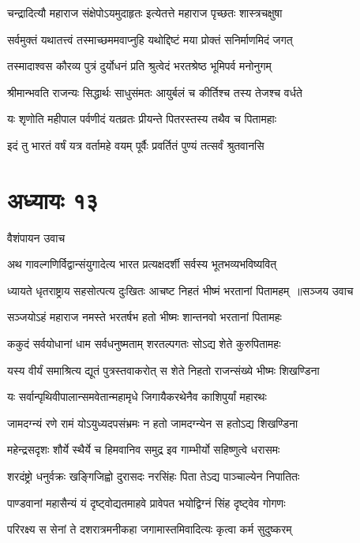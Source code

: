 \twolineshloka
{चन्द्रादित्यौ महाराज संक्षेपोऽयमुदाहृतः}
{इत्येतत्ते महाराज पृच्छतः शास्त्रचक्षुषा}


\twolineshloka
{सर्वमुक्तं यथातत्त्वं तस्माच्छममवाप्नुहि}
{यथोद्दिष्टं मया प्रोक्तं सनिर्माणमिदं जगत्}


\twolineshloka
{तस्मादाश्वस कौरव्य पुत्रं दुर्योधनं प्रति}
{श्रुत्वेदं भरतश्रेष्ठ भूमिपर्व मनोनुगम्}


\twolineshloka
{श्रीमान्भवति राजन्यः सिद्धार्थः साधुसंमतः}
{आयुर्बलं च कीर्तिश्च तस्य तेजश्च वर्धते}


\twolineshloka
{यः शृणोति महीपाल पर्वणीदं यतव्रतः}
{प्रीयन्ते पितरस्तस्य तथैव च पितामहाः}


\twolineshloka
{इदं तु भारतं वर्षं यत्र वर्तामहे वयम्}
{पूर्वैः प्रवर्तितं पुण्यं तत्सर्वं श्रुतवानसि}


\chapter{अध्यायः १३}
\twolineshloka
{वैशंपायन उवाच}
{}


\twolineshloka
{अथ गावल्गणिर्विद्वान्संयुगादेत्य भारत}
{प्रत्यक्षदर्शी सर्वस्य भूतभव्यभविष्यवित्}


\threelineshloka
{ध्यायते धृतराष्ट्राय सहसोत्पत्य दुःखितः}
{आचष्ट निहतं भीष्मं भरतानां पितामहम् ॥सञ्जय उवाच}
{}


\twolineshloka
{सञ्जयोऽहं महाराज नमस्ते भरतर्षभ}
{हतो भीष्मः शान्तनवो भरतानां पितामहः}


\twolineshloka
{ककुदं सर्वयोधानां धाम सर्वधनुष्मताम्}
{शरतल्पगतः सोऽद्य शेते कुरुपितामहः}


\twolineshloka
{यस्य वीर्यं समाश्रित्य द्यूतं पुत्रस्तवाकरोत्}
{स शेते निहतो राजन्संख्ये भीष्मः शिखण्डिना}


\twolineshloka
{यः सर्वान्पृथिवीपालान्समवेतान्महामृधे}
{जिगायैकरथेनैव काशिपुर्यां महारथः}


\twolineshloka
{जामदग्न्यं रणे रामं योऽयुध्यदपसंभ्रमः}
{न हतो जामदग्न्येन स हतोऽद्य शिखण्डिना}


\twolineshloka
{महेन्द्रसदृशः शौर्ये स्थैर्ये च हिमवानिव}
{समुद्र इव गाम्भीर्यो सहिष्णुत्वे धरासमः}


\twolineshloka
{शरदंष्ट्रो धनुर्वक्रः खङ्गिजिह्वो दुरासदः}
{नरसिंहः पिता तेऽद्य पाञ्चाल्येन निपातितः}


\twolineshloka
{पाण्डवानां महासैन्यं यं दृष्ट्वोद्यतमाहवे}
{प्रावेपत भयोद्विग्नं सिंह दृष्ट्वेव गोगणः}


\twolineshloka
{परिरक्ष्य स सेनां ते दशरात्रमनीकहा}
{जगामास्तमिवादित्यः कृत्वा कर्म सुदुष्करम्}


